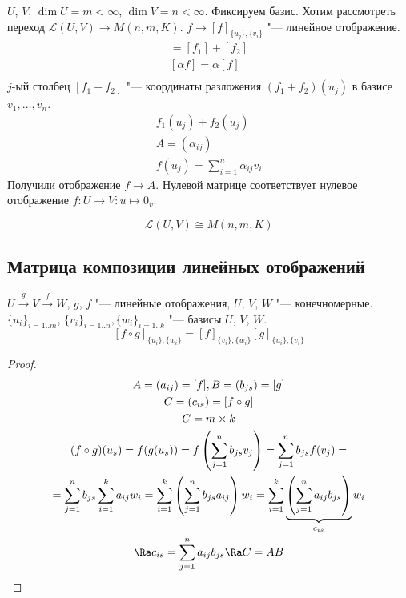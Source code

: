 $U$, $V$, $\dim U = m < \infty$, $\dim V = n < \infty$.
Фиксируем базис. Хотим рассмотреть переход $\mathcal{L}(U, V) \to M(n, m, K)$.
$f \to [f]_{\{u_j\}, \{v_i\}}$ "--- линейное отображение.
\begin{gather*}
	[f_1 + f_2] = [f_1] + [f_2] \\
	[\alpha f] = \alpha[f] \\
\end{gather*}
$j$-ый столбец $[f_1 + f_2]$ "--- координаты разложения $(f_1 + f_2)(u_j)$ в базисе $v_1, \dots, v_n$.
\begin{gather*}
	f_1(u_j) + f_2(u_j) \\
	A = (\alpha_{ij}) \\
	f(u_j) = \sum_{i = 1}^n\alpha_{ij}v_i
\end{gather*}
Получили отображение $f \to A$.
Нулевой матрице соответствует нулевое отображение $f\colon U \to V\colon u \mapsto 0_v$.
\begin{conseq}
	\[ \mathcal{L}(U, V) \cong M(n, m, K) \]
\end{conseq}

\subsection{Матрица композиции линейных отображений}

\begin{theorem}
	$U \stackrel{g}{\to} V \stackrel{f}{\to}W$, $g$, $f$ "--- линейные отображения,
	$U$, $V$, $W$ "--- конечномерные.
	$\{u_i\}_{i=1..m}$, $\{v_i\}_{i=1..n}, \{w_i\}_{i = 1..k}$ "--- базисы $U$, $V$, $W$.
	\[ [f \circ g]_{\{u_i\}, \{w_i\}} = [f]_{\{v_i\}, \{w_i\}}[g]_{\{u_i\}, \{v_i\}} \]
\end{theorem}

\begin{proof}
	\begin{gather*}
		A = (a_{ij}) = [f], B = (b_{js}) = [g] \\
		C = (c_{is}) = [f \circ g] \\
		C = m \times k \\
		(f \circ g)(u_s) = f(g(u_s)) = f\left(\sum_{j = 1}^nb_{js}v_j\right) = \sum_{j = 1}^nb_{js}f(v_j) = \\
		= \sum_{j = 1}^nb_{js}\sum_{i = 1}^ka_{ij}w_i = \sum_{i = 1}^k\left(\sum_{j = 1}^nb_{js}a_{ij}\right) w_i
			= \sum_{i = 1}^k\underbrace{\left(\sum_{j = 1}^na_{ij}b_{js}\right)}_{c_{is}}w_i \\
		\Ra c_{is} = \sum_{j = 1}^na_{ij}b_{js} \Ra C = AB
	\end{gather*}
\end{proof}

